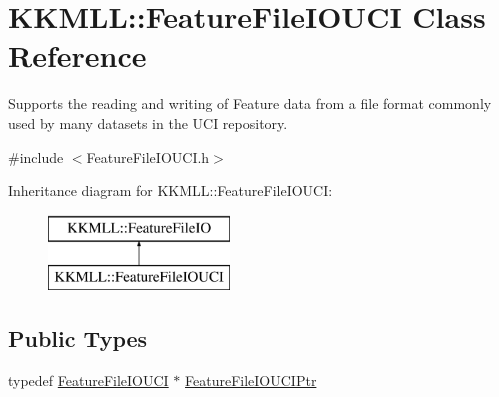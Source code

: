 \hypertarget{class_k_k_m_l_l_1_1_feature_file_i_o_u_c_i}{}\section{K\+K\+M\+LL\+:\+:Feature\+File\+I\+O\+U\+CI Class Reference}
\label{class_k_k_m_l_l_1_1_feature_file_i_o_u_c_i}


Supports the reading and writing of Feature data from a file format commonly used by many dataset\textquotesingle{}s in the U\+CI repository.  




{\ttfamily \#include $<$Feature\+File\+I\+O\+U\+C\+I.\+h$>$}

Inheritance diagram for K\+K\+M\+LL\+:\+:Feature\+File\+I\+O\+U\+CI\+:\begin{figure}[H]
\begin{center}
\leavevmode
\includegraphics[height=2.000000cm]{class_k_k_m_l_l_1_1_feature_file_i_o_u_c_i}
\end{center}
\end{figure}
\subsection*{Public Types}
\begin{DoxyCompactItemize}
\item 
typedef \hyperlink{class_k_k_m_l_l_1_1_feature_file_i_o_u_c_i}{Feature\+File\+I\+O\+U\+CI} $\ast$ \hyperlink{class_k_k_m_l_l_1_1_feature_file_i_o_u_c_i_a1453fcbcafd3fd7327385f77a2c94aa2}{Feature\+File\+I\+O\+U\+C\+I\+Ptr}
\end{DoxyCompactItemize}
